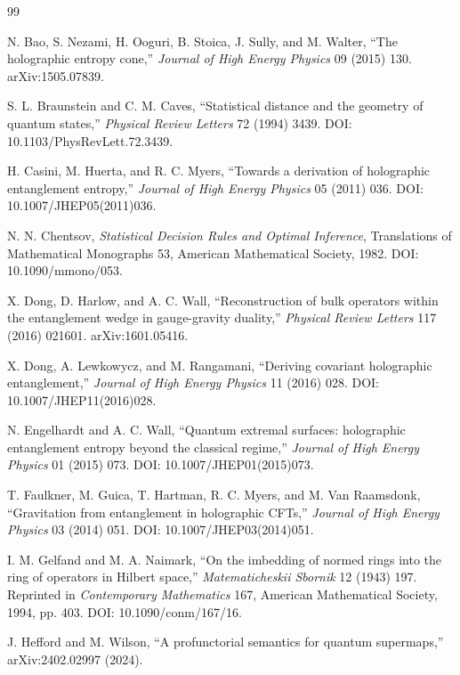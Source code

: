 \documentclass[11pt,letterpaper]{article}
\theoremstyle{definition}
\theoremstyle{remark}
\begin{document}
\begin{thebibliography}{99}
\small

N. Bao, S. Nezami, H. Ooguri, B. Stoica, J. Sully, and M. Walter,
``The holographic entropy cone,''
\emph{Journal of High Energy Physics} 09 (2015) 130.
arXiv:1505.07839.

S. L. Braunstein and C. M. Caves,
``Statistical distance and the geometry of quantum states,''
\emph{Physical Review Letters} 72 (1994) 3439.
DOI: 10.1103/PhysRevLett.72.3439.

H. Casini, M. Huerta, and R. C. Myers,
``Towards a derivation of holographic entanglement entropy,''
\emph{Journal of High Energy Physics} 05 (2011) 036.
DOI: 10.1007/JHEP05(2011)036.

N. N. Chentsov,
\emph{Statistical Decision Rules and Optimal Inference},
Translations of Mathematical Monographs 53, American Mathematical Society, 1982.
DOI: 10.1090/mmono/053.

X. Dong, D. Harlow, and A. C. Wall,
``Reconstruction of bulk operators within the entanglement wedge in gauge-gravity duality,''
\emph{Physical Review Letters} 117 (2016) 021601.
arXiv:1601.05416.

X. Dong, A. Lewkowycz, and M. Rangamani,
``Deriving covariant holographic entanglement,''
\emph{Journal of High Energy Physics} 11 (2016) 028.
DOI: 10.1007/JHEP11(2016)028.

N. Engelhardt and A. C. Wall,
``Quantum extremal surfaces: holographic entanglement entropy beyond the classical regime,''
\emph{Journal of High Energy Physics} 01 (2015) 073.
DOI: 10.1007/JHEP01(2015)073.

T. Faulkner, M. Guica, T. Hartman, R. C. Myers, and M. Van Raamsdonk,
``Gravitation from entanglement in holographic CFTs,''
\emph{Journal of High Energy Physics} 03 (2014) 051.
DOI: 10.1007/JHEP03(2014)051.

I. M. Gelfand and M. A. Naimark,
``On the imbedding of normed rings into the ring of operators in Hilbert space,''
\emph{Matematicheskii Sbornik} 12 (1943) 197.
Reprinted in \emph{Contemporary Mathematics} 167, American Mathematical Society, 1994, pp. 403.
DOI: 10.1090/conm/167/16.

J. Hefford and M. Wilson,
``A profunctorial semantics for quantum supermaps,''
arXiv:2402.02997 (2024).


\end{thebibliography}
\end{document}
